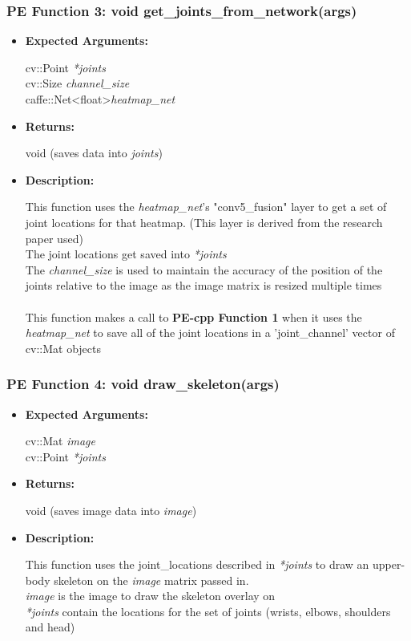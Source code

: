 \documentclass{scrreprt}
\begin{document}
\subsubsection{PE Function 3: void get\_joints\_from\_network(args)}
\begin{itemize}
    \item \textbf{Expected Arguments:}

    cv::Point \quad\textit{*joints}
    \\
    cv::Size \quad\textit{channel\_size}
    \\
    caffe::Net\textless float\textgreater\quad\textit{heatmap\_net}

    \item \textbf{Returns:}

    void (saves data into \textit{joints})

    \item \textbf{Description:}

    This function uses the \textit{heatmap\_net}'s "conv5\_fusion" layer to get a set of joint locations for that heatmap. (This layer is derived from the research paper used)
    \\
    The joint locations get saved into \textit{*joints}
    \\
    The \textit{channel\_size} is used to maintain the accuracy of the position of the joints relative to the image as the image matrix is resized multiple times
    \\\\
    This function makes a call to \textbf{PE-cpp Function 1} when it uses the \textit{heatmap\_net} to save all of the joint locations in a 'joint\_channel' vector of cv::Mat objects
\end{itemize}


\subsubsection{PE Function 4: void draw\_skeleton(args)}
\begin{itemize}
    \item \textbf{Expected Arguments:}

    cv::Mat \quad\textit{image}
    \\
    cv::Point \quad\textit{*joints}

    \item \textbf{Returns:}

    void (saves image data into \textit{image})

    \item \textbf{Description:}

    This function uses the joint\_locations described in \textit{*joints} to draw an upper-body skeleton on the \textit{image} matrix passed in.
    \\
    \textit{image} is the image to draw the skeleton overlay on
    \\
    \textit{*joints} contain the locations for the set of joints (wrists, elbows, shoulders and head)
\end{itemize}
\end{document}

